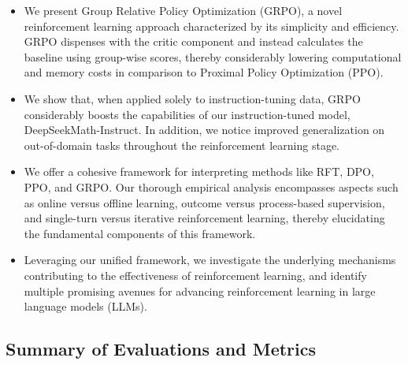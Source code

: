 \begin{itemize}[topsep=0pt]
    \item We present Group Relative Policy Optimization (GRPO), a novel reinforcement learning approach characterized by its simplicity and efficiency. GRPO dispenses with the critic component and instead calculates the baseline using group-wise scores, thereby considerably lowering computational and memory costs in comparison to Proximal Policy Optimization (PPO).
    \item We show that, when applied solely to instruction-tuning data, GRPO considerably boosts the capabilities of our instruction-tuned model, DeepSeekMath-Instruct. In addition, we notice improved generalization on out-of-domain tasks throughout the reinforcement learning stage.
    \item We offer a cohesive framework for interpreting methods like RFT, DPO, PPO, and GRPO. Our thorough empirical analysis encompasses aspects such as online versus offline learning, outcome versus process-based supervision, and single-turn versus iterative reinforcement learning, thereby elucidating the fundamental components of this framework.
    \item Leveraging our unified framework, we investigate the underlying mechanisms contributing to the effectiveness of reinforcement learning, and identify multiple promising avenues for advancing reinforcement learning in large language models (LLMs).
\end{itemize}

\subsection{Summary of Evaluations and Metrics}

